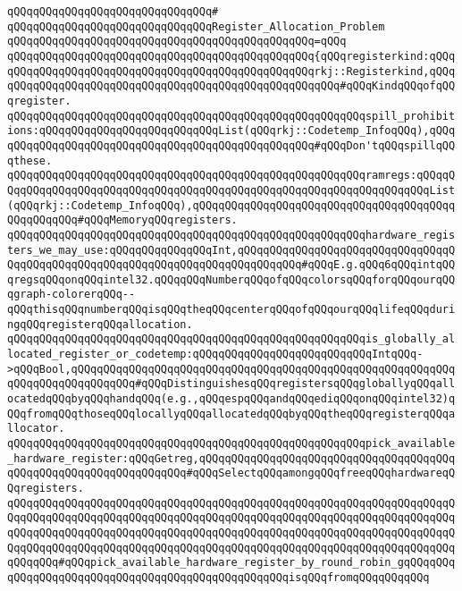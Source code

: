 \verb|qQQqqQQqqQQqqQQqqQQqqQQqqQQqqQQq#|\newline
\verb|qQQqqQQqqQQqqQQqqQQqqQQqqQQqqQQqRegister_Allocation_Problem|\newline
\verb|qQQqqQQqqQQqqQQqqQQqqQQqqQQqqQQqqQQqqQQqqQQqqQQq=qQQq|\newline
\verb|qQQqqQQqqQQqqQQqqQQqqQQqqQQqqQQqqQQqqQQqqQQqqQQq{qQQqregisterkind:qQQqqQQqqQQqqQQqqQQqqQQqqQQqqQQqqQQqqQQqqQQqqQQqqQQqrkj::Registerkind,qQQqqQQqqQQqqQQqqQQqqQQqqQQqqQQqqQQqqQQqqQQqqQQqqQQqqQQq#qQQqKindqQQqofqQQqregister.|\newline
\verb|qQQqqQQqqQQqqQQqqQQqqQQqqQQqqQQqqQQqqQQqqQQqqQQqqQQqqQQqspill_prohibitions:qQQqqQQqqQQqqQQqqQQqqQQqqQQqList(qQQqrkj::Codetemp_InfoqQQq),qQQqqQQqqQQqqQQqqQQqqQQqqQQqqQQqqQQqqQQqqQQqqQQqqQQq#qQQqDon'tqQQqspillqQQqthese.|\newline
\verb|qQQqqQQqqQQqqQQqqQQqqQQqqQQqqQQqqQQqqQQqqQQqqQQqqQQqqQQqramregs:qQQqqQQqqQQqqQQqqQQqqQQqqQQqqQQqqQQqqQQqqQQqqQQqqQQqqQQqqQQqqQQqqQQqqQQqList(qQQqrkj::Codetemp_InfoqQQq),qQQqqQQqqQQqqQQqqQQqqQQqqQQqqQQqqQQqqQQqqQQqqQQqqQQq#qQQqMemoryqQQqregisters.|\newline
\newline
\verb|qQQqqQQqqQQqqQQqqQQqqQQqqQQqqQQqqQQqqQQqqQQqqQQqqQQqqQQqhardware_registers_we_may_use:qQQqqQQqqQQqqQQqInt,qQQqqQQqqQQqqQQqqQQqqQQqqQQqqQQqqQQqqQQqqQQqqQQqqQQqqQQqqQQqqQQqqQQqqQQqqQQqqQQq#qQQqE.g.qQQq6qQQqintqQQqregsqQQqonqQQqintel32.qQQqqQQqNumberqQQqofqQQqcolorsqQQqforqQQqourqQQqgraph-colorerqQQq--qQQqthisqQQqnumberqQQqisqQQqtheqQQqcenterqQQqofqQQqourqQQqlifeqQQqduringqQQqregisterqQQqallocation.|\newline
\newline
\verb|qQQqqQQqqQQqqQQqqQQqqQQqqQQqqQQqqQQqqQQqqQQqqQQqqQQqqQQqis_globally_allocated_register_or_codetemp:qQQqqQQqqQQqqQQqqQQqqQQqqQQqIntqQQq->qQQqBool,qQQqqQQqqQQqqQQqqQQqqQQqqQQqqQQqqQQqqQQqqQQqqQQqqQQqqQQqqQQqqQQqqQQqqQQqqQQqqQQq#qQQqDistinguishesqQQqregistersqQQqgloballyqQQqallocatedqQQqbyqQQqhandqQQq(e.g.,qQQqespqQQqandqQQqediqQQqonqQQqintel32)qQQqfromqQQqthoseqQQqlocallyqQQqallocatedqQQqbyqQQqtheqQQqregisterqQQqallocator.|\newline
\verb|qQQqqQQqqQQqqQQqqQQqqQQqqQQqqQQqqQQqqQQqqQQqqQQqqQQqqQQqpick_available_hardware_register:qQQqGetreg,qQQqqQQqqQQqqQQqqQQqqQQqqQQqqQQqqQQqqQQqqQQqqQQqqQQqqQQqqQQqqQQqqQQq#qQQqSelectqQQqamongqQQqfreeqQQqhardwareqQQqregisters.|\newline
\verb|qQQqqQQqqQQqqQQqqQQqqQQqqQQqqQQqqQQqqQQqqQQqqQQqqQQqqQQqqQQqqQQqqQQqqQQqqQQqqQQqqQQqqQQqqQQqqQQqqQQqqQQqqQQqqQQqqQQqqQQqqQQqqQQqqQQqqQQqqQQqqQQqqQQqqQQqqQQqqQQqqQQqqQQqqQQqqQQqqQQqqQQqqQQqqQQqqQQqqQQqqQQqqQQqqQQqqQQqqQQqqQQqqQQqqQQqqQQqqQQqqQQqqQQqqQQqqQQqqQQqqQQqqQQqqQQqqQQqqQQqqQQqqQQq#qQQqpick_available_hardware_register_by_round_robin_gqQQqqQQqqQQqqQQqqQQqqQQqqQQqqQQqqQQqqQQqqQQqqQQqqQQqisqQQqfromqQQqqQQqqQQq|\newline
